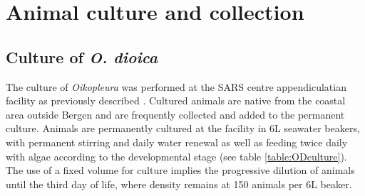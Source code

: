 \documentclass[11pt,twoside,a4paper]{report}
\begin{document}
		    
	\section{Animal culture and collection}
		\subsection{Culture of \textit{O. dioica}}
		The culture of \textit{Oikopleura} was performed at the SARS centre appendiculatian facility as previously described \cite{Bouquet2009}. Cultured animals are native from the coastal area outside Bergen and are frequently collected and added to the permanent culture. Animals are permanently cultured at the facility in 6L seawater beakers, with permanent stirring and daily water renewal as well as feeding twice daily with algae according to the developmental stage (see table \ref{table:ODculture}). The use of a fixed volume for culture implies the progressive dilution of animals until the third day of life, where density remains at 150 animals per 6L beaker.
		
\end{document}
